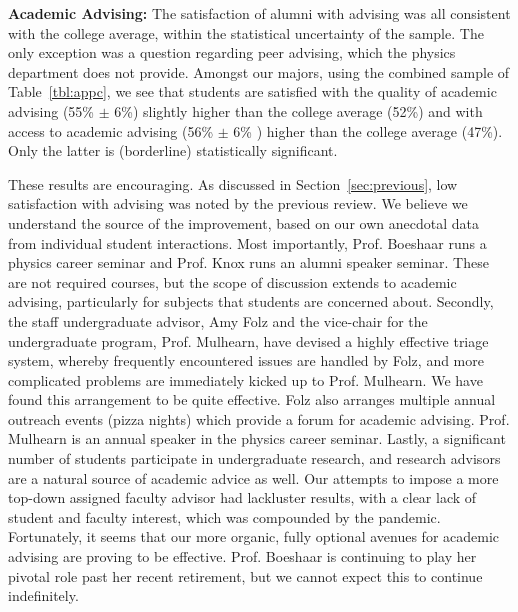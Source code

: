 \documentclass[12pt]{article}
\begin{document}
\noindent
{\bf Academic Advising:} The satisfaction of alumni with advising was
all consistent with the college average, within the statistical
uncertainty of the sample.  The only exception was a question
regarding peer advising, which the physics department does not provide.  
Amongst our majors, using the combined
sample of Table~\ref{tbl:appc}, we see that students are satisfied
with the quality of academic advising (55\% $\pm$ 6\%) slightly higher
than the college average (52\%) and with access to academic advising
(56\% $\pm$ 6\% ) higher than the college average (47\%).  Only the
latter is (borderline) statistically significant.

These results are encouraging.  As discussed in
Section~\ref{sec:previous}, low satisfaction with advising was noted
by the previous review.  We believe we understand the source of the
improvement, based on our own anecdotal data from individual student
interactions.  Most importantly, Prof. Boeshaar runs a physics career
seminar and Prof. Knox runs an alumni speaker seminar.  These are not
required courses, but the scope of discussion extends to
academic advising, particularly for subjects that students are
concerned about.  Secondly, the staff undergraduate advisor, Amy Folz
and the vice-chair for the undergraduate program, Prof. Mulhearn, have
devised a highly effective triage system, whereby frequently encountered issues are
handled by Folz, and more complicated problems are immediately kicked
up to Prof. Mulhearn.  We have found this arrangement to be quite
effective.  Folz also arranges multiple annual outreach events (pizza
nights) which provide a forum for academic advising.  Prof. Mulhearn
is an annual speaker in the physics career seminar.  Lastly, a
significant number of students participate in undergraduate research,
and research advisors are a natural source of academic advice as well.
Our attempts to impose a more top-down assigned faculty advisor had
lackluster results, with a clear lack of student and faculty interest,
which was compounded by the pandemic.  Fortunately, it seems that our
more organic, fully optional avenues for academic advising are proving
to be effective.  Prof. Boeshaar is continuing to play her pivotal
role past her recent retirement, but we cannot expect this to continue
indefinitely.\\[3pt]
\end{document}

